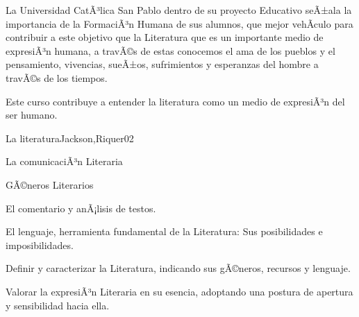 \begin{syllabus}


\begin{justification}
La Universidad CatÃ³lica San Pablo dentro de su proyecto Educativo seÃ±ala la importancia de la FormaciÃ³n Humana de sus alumnos, que mejor vehÃ­culo para contribuir a este objetivo que la Literatura que es un importante medio de expresiÃ³n humana, a travÃ©s de estas  conocemos el ama de los pueblos y el pensamiento, vivencias, sueÃ±os, sufrimientos y esperanzas del hombre a travÃ©s de los tiempos.
\end{justification}

\begin{goals}
\item Este curso contribuye a entender la literatura como un medio de expresiÃ³n del ser humano.
\end{goals}

\begin{outcomes}
\end{outcomes}

\begin{unit}{La literatura}{Jackson,Riquer}{0}{2}
\begin{topics}
	\item La comunicaciÃ³n Literaria
	\item GÃ©neros Literarios
	\item El comentario y anÃ¡lisis de testos.
	\item El lenguaje, herramienta fundamental de la Literatura: Sus posibilidades e imposibilidades.
\end{topics}
\begin{unitgoals}
	\item Definir y caracterizar la Literatura, indicando sus gÃ©neros, recursos y lenguaje.
	\item Valorar la expresiÃ³n Literaria en su esencia, adoptando una postura de apertura y sensibilidad hacia ella.
\end{unitgoals}
\end{unit}


\end{syllabus}
